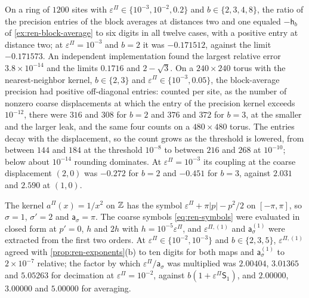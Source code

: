 \begin{numcheck}\label{chk:ren-block-average}
On a ring of $1200$ sites with $\varepsilon^\Pi\in\{10^{-3},10^{-2},0.2\}$ and $b\in\{2,3,4,8\}$, the ratio of the precision entries of the block averages at distances two and one equaled $-\mathsf h_b$ of \cref{ex:ren-block-average} to six digits in all twelve cases, with a positive entry at distance two; at $\varepsilon^\Pi=10^{-3}$ and $b=2$ it was $-0.171512$, against the limit $-0.171573$. An independent implementation found the largest relative error $3.8\times10^{-14}$ and the limits $0.1716$ and $2-\sqrt3$. On a $240\times240$ torus with the nearest-neighbor kernel, $b\in\{2,3\}$ and $\varepsilon^\Pi\in\{10^{-3},0.05\}$, the block-average precision had positive off-diagonal entries: counted per site, as the number of nonzero coarse displacements at which the entry of the precision kernel exceeds $10^{-12}$, there were $316$ and $308$ for $b=2$ and $376$ and $372$ for $b=3$, at the smaller and the larger leak, and the same four counts on a $480\times480$ torus. The entries decay with the displacement, so the count grows as the threshold is lowered, from between $144$ and $184$ at the threshold $10^{-8}$ to between $216$ and $268$ at $10^{-10}$; below about $10^{-14}$ rounding dominates. At $\varepsilon^\Pi=10^{-3}$ its coupling at the coarse displacement $(2,0)$ was $-0.272$ for $b=2$ and $-0.451$ for $b=3$, against $2.031$ and $2.590$ at $(1,0)$.
\end{numcheck}

\begin{numcheck}\label{chk:ren-exponents}
The kernel $a^\Pi(x)=1/x^2$ on $\mathbb{Z}$ has the symbol $\varepsilon^\Pi+\pi\lvert p\rvert-p^2/2$ on $[-\pi,\pi]$, so $\sigma=1$, $\sigma'=2$ and $\mathsf a_\sigma=\pi$. The coarse symbols \eqref{eq:ren-symbols} were evaluated in closed form at $p'=0$, $h$ and $2h$ with $h=10^{-5}\varepsilon^\Pi$, and $\varepsilon^{\Pi,(1)}$ and $\mathsf a^{(1)}_\sigma$ were extracted from the first two orders. At $\varepsilon^\Pi\in\{10^{-2},10^{-3}\}$ and $b\in\{2,3,5\}$, $\varepsilon^{\Pi,(1)}$ agreed with \cref{prop:ren-exponents}(b) to ten digits for both maps and $\mathsf a^{(1)}_\sigma$ to $2\times10^{-7}$ relative; the factor by which $\varepsilon^\Pi/\mathsf a_\sigma$ was multiplied was $2.00404$, $3.01365$ and $5.05263$ for decimation at $\varepsilon^\Pi=10^{-2}$, against $b(1+\varepsilon^\Pi\mathsf S_1)$, and $2.00000$, $3.00000$ and $5.00000$ for averaging.
\end{numcheck}

